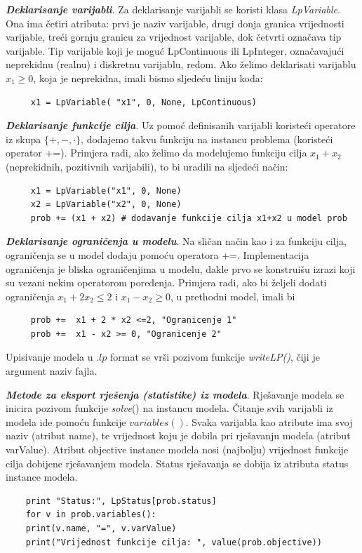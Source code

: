 \documentclass[a4paper, utf8, 11pt, colorlinks]{book}
\begin{document}
\textbf{\emph{Deklarisanje varijabli}}.  Za deklarisanje varijabli se koristi klasa \emph{LpVariable}. Ona ima četiri atributa: prvi je naziv varijable, drugi donja granica vrijednosti varijable, treći gornju granicu za vrijednost varijable, dok četvrti označava tip varijable. Tip varijable koji je moguć LpContinuous ili LpInteger, označavajući neprekidnu (realnu) i diskretnu varijablu, redom.  
Ako želimo deklarisati varijablu $x_1\geq 0$, koja je neprekidna, imali bismo sljedeću liniju koda:
\begin{verbatim}
	 x1 = LpVariable( "x1", 0, None, LpContinuous)
\end{verbatim}
\textbf{\emph{Deklarisanje funkcije cilja}}. Uz pomoć definisanih varijabli koristeći operatore iz skupa $\{+,-, \cdot \}$, dodajemo takvu funkciju na instancu problema (koristeći operator +=). Primjera radi, ako želimo da modelujemo funkciju cilja $x_1 + x_2$ (neprekidnih, pozitivnih varijabili), to bi uradili na sljedeći način:
\begin{verbatim}
	 x1 = LpVariable("x1", 0, None)
	 x2 = LpVariable("x2", 0, None) 
	 prob += (x1 + x2) # dodavanje funkcije cilja x1+x2 u model prob
\end{verbatim}  
\textbf{\emph{Deklarisanje ograničenja u modelu}}.  Na sličan način kao i za funkciju cilja, ograničenja se  u model dodaju pomoću operatora +=. Implementacija ograničenja je bliska ograničenjima u modelu, dakle prvo se konstruišu izrazi koji su vezani nekim operatorom poređenja. Primjera radi, ako bi željeli dodati ograničenja $x_1 + 2 x_2 \leq 2$ i $x_1-x_2 \geq 0$,  u prethodni model, imali bi 
\begin{verbatim}
	 prob +=  x1 + 2 * x2 <=2, "Ogranicenje 1"
	 prob +=  x1 - x2 >= 0, "Ogranicenje 2" 
\end{verbatim}
Upisivanje modela u .$lp$ format se vrši pozivom funkcije \emph{writeLP()}, čiji je argument naziv fajla. 

 \noindent \textbf{\emph{Metode za eksport rješenja (statistike) iz modela}}. Rješavanje modela se inicira pozivom funkcije \emph{solve}() na instancu modela. Čitanje svih varijabli iz modela ide pomoću funkcije $variables()$. Svaka varijabla kao atribute ima svoj naziv (atribut name), te vrijednost koju je dobila pri rješavanju modela (atribut varValue). Atribut objective instance modela nosi (najbolju) vrijednost funkcije cilja dobijene rješavanjem modela. Status rješavanja se dobija iz atributa status instance modela. 
 
 \begin{verbatim}
 	print "Status:", LpStatus[prob.status]
 	for v in prob.variables():
 	print(v.name, "=", v.varValue)
 	print("Vrijednost funkcije cilja: ", value(prob.objective))
 \end{verbatim}
\end{document}
